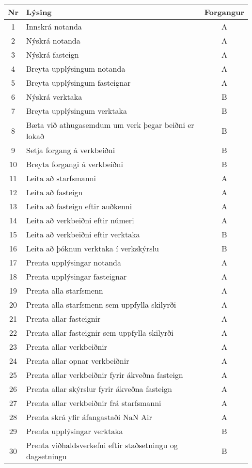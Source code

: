 \documentclass[a4paper]{article}
\begin{document}
\begin{tabular}{|c|p{10cm}|c|}
\hline
Nr&Lýsing&Forgangur\\
\hline
1&Innskrá notanda&A\\
\hline
2&Nýskrá notanda&A\\
\hline
3&Nýskrá fasteign&A\\
\hline
4&Breyta upplýsingum notanda&A\\
\hline
5&Breyta upplýsingum fasteignar&A\\
\hline
6&Nýskrá verktaka&B\\
\hline
7&Breyta upplýsingum verktaka&B\\
\hline
8&Bæta við athugasemdum um verk þegar beiðni er lokað&B\\
\hline
9&Setja forgang á verkbeiðni&B\\
\hline
10&Breyta forgangi á verkbeiðni&B\\
\hline
11&Leita að starfsmanni&A\\
\hline
12&Leita að fasteign&A\\
\hline
13&Leita að fasteign eftir auðkenni&A\\
\hline
14&Leita að verkbeiðni eftir númeri&A\\
\hline
15&Leita að verkbeiðni eftir verktaka&B\\
\hline
16&Leita að þóknun verktaka í verkskýrslu&B\\
\hline
17&Prenta upplýsingar notanda&A\\
\hline
18&Prenta upplýsingar fasteignar&A\\
\hline
19&Prenta alla starfsmenn&A\\
\hline
20&Prenta alla starfsmenn sem uppfylla skilyrði&A\\
\hline
21&Prenta allar fasteignir&A\\
\hline
22&Prenta allar fasteignir sem uppfylla skilyrði&A\\
\hline
23&Prenta allar verkbeiðnir&A\\
\hline
24&Prenta allar opnar verkbeiðnir&A\\
\hline
25&Prenta allar verkbeiðnir fyrir ákveðna fasteign&A\\
\hline
26&Prenta allar skýrslur fyrir ákveðna fasteign&A\\
\hline
27&Prenta allar verkbeiðnir frá starfsmanni&A\\
\hline
28&Prenta skrá yfir áfangastaði NaN Air&A\\
\hline
29&Prenta upplýsingar verktaka&B\\
\hline
30&Prenta viðhaldsverkefni eftir staðsetningu og dagsetningu&B\\

\end{tabular}
\end{document}
